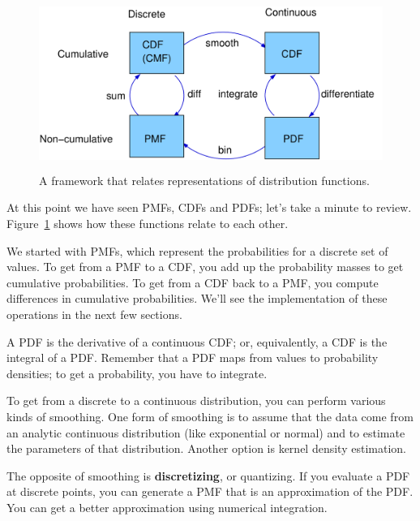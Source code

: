 \documentclass[12pt]{book}
\begin{document}
\begin{figure}
\centerline{\includegraphics[height=2.2in]{figs/distribution_functions.pdf}}
\caption{A framework that relates representations of distribution
functions.}
\label{dist_framework}
\end{figure}

At this point we have seen PMFs, CDFs and PDFs; let's take a minute
to review.  Figure~\ref{dist_framework} shows how these functions relate
to each other.

We started with PMFs, which represent the probabilities for a discrete
set of values.  To get from a PMF to a CDF, you add up the probability
masses to get cumulative probabilities.  
To get from a CDF back to a PMF, you compute differences in cumulative
probabilities.  We'll see the implementation of these operations
in the next few sections.

A PDF is the derivative of a continuous CDF; or, equivalently,
a CDF is the integral of a PDF.  Remember that a PDF maps from
values to probability densities; to get a probability, you have to
integrate.

To get from a discrete to a continuous distribution, you can perform
various kinds of smoothing.  One form of smoothing is to assume that
the data come from an analytic continuous distribution
(like exponential or normal) and to estimate the parameters of that
distribution.  Another option is kernel density estimation.

The opposite of smoothing is {\bf discretizing}, or quantizing.  If you
evaluate a PDF at discrete points, you can generate a PMF that is an
approximation of the PDF.  You can get a better approximation using
numerical integration.  
\end{document}
